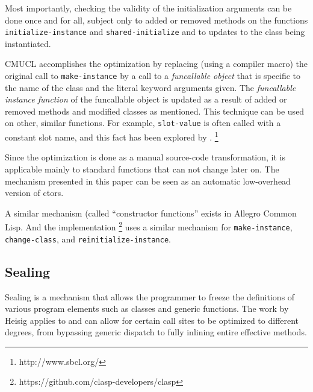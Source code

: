 Most importantly, checking the validity of the initialization
arguments can be done once and for all, subject only to added or
removed methods on the functions \texttt{initialize-instance} and
\texttt{shared-initialize} and to updates to the class being
instantiated.

CMUCL accomplishes the optimization by replacing (using a compiler
macro) the original call to \texttt{make-instance} by a call to a
\emph{funcallable object} that is specific to the name of the class
and the literal keyword arguments given.  The \emph{funcallable
  instance function} of the funcallable object is updated as a result
of added or removed methods and modified classes as mentioned.
This technique can be used on other, similar functions.  For example,
\texttt{slot-value} is often called with a constant slot name, and
this fact has been explored by \sbcl{}.%
\footnote{http://www.sbcl.org/}

Since the optimization is done as a manual source-code transformation,
it is applicable mainly to standard functions that can not change later
on.  The mechanism presented in this paper can be seen as an automatic
low-overhead version of ctors.

A similar mechanism (called ``constructor functions'' exists in
Allegro Common Lisp.  And the \clasp{} \commonlisp{} implementation%
\footnote{https://github.com/clasp-developers/clasp}
uses a similar mechanism for \texttt{make-instance},
\texttt{change-class}, and \texttt{reinitialize-instance}.

\subsection{Sealing}

Sealing is a mechanism that allows the programmer to freeze the
definitions of various program elements such as classes and generic
functions.  The work by Heisig \cite{Heisig:2020:ELS:Sealable} applies
to \commonlisp{} and can allow for certain call sites to be
optimized to different degrees, from bypassing generic dispatch to
fully inlining entire effective methods.

